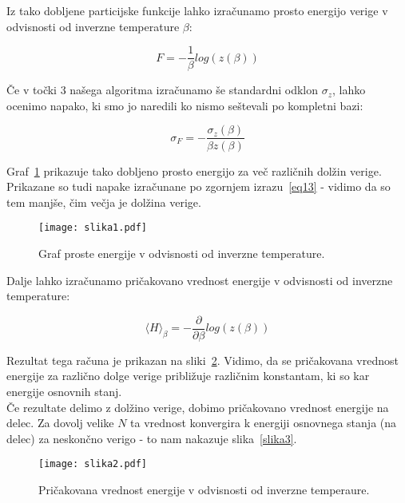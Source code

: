 \documentclass[a4paper]{article}
\newcommand{\pder}[2]{\frac{\partial#1}{\partial#2}}
\begin{document}
    Iz tako dobljene particijske funkcije lahko izračunamo prosto energijo verige v odvisnosti od inverzne temperature
    $\beta$:

    \begin{equation}\label{eq12}
        F = -\frac{1}{\beta}log(z(\beta))
    \end{equation}

    Če v točki $3$ našega algoritma izračunamo še standardni odklon $\sigma_z$, lahko ocenimo napako, ki smo jo naredili
    ko nismo seštevali po kompletni bazi:

    \begin{equation}\label{eq13}
    \sigma_F = -\frac{\sigma_z(\beta)}{\beta z(\beta)}
    \end{equation}

    Graf~\ref{slika1} prikazuje tako dobljeno prosto energijo za več različnih dolžin verige.
    Prikazane so tudi napake izračunane po zgornjem izrazu~\ref{eq13} - vidimo da so tem manjše, čim večja je dolžina
    verige.

    \begin{figure}
        \centering
        \texttt{[image: slika1.pdf]}
        \caption{Graf proste energije v odvisnosti od inverzne temperature.}
        \label{slika1}
    \end{figure}

    Dalje lahko izračunamo pričakovano vrednost energije v odvisnosti od inverzne temperature:

    \begin{equation}\label{eq14}
        \langle H \rangle_\beta = -\pder{}{\beta} log(z(\beta))
    \end{equation}

    Rezultat tega računa je prikazan na sliki~\ref{slika2}.
    Vidimo, da se pričakovana vrednost energije za različno dolge verige približuje različnim konstantam, ki so kar
    energije osnovnih stanj.\\

    Če rezultate delimo z dolžino verige, dobimo pričakovano vrednost energije na delec.
    Za dovolj velike $N$ ta vrednost konvergira k energiji osnovnega stanja (na delec) za neskončno verigo - to nam
    nakazuje slika~\ref{slika3}.

    \begin{figure}
        \centering
        \texttt{[image: slika2.pdf]}
        \caption{Pričakovana vrednost energije v odvisnosti od inverzne temperaure.}
        \label{slika2}
    \end{figure}
\end{document}
